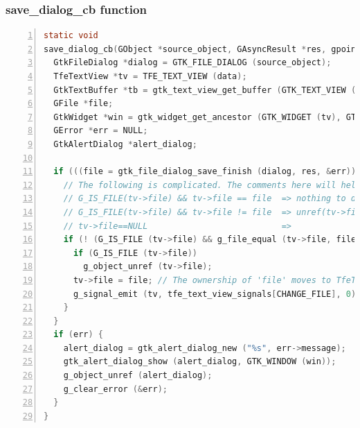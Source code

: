 \subsubsection{save\_dialog\_cb function}\label{save_dialog_cb-function}

\begin{lstlisting}[language=C, numbers=left]
static void
save_dialog_cb(GObject *source_object, GAsyncResult *res, gpointer data) {
  GtkFileDialog *dialog = GTK_FILE_DIALOG (source_object);
  TfeTextView *tv = TFE_TEXT_VIEW (data);
  GtkTextBuffer *tb = gtk_text_view_get_buffer (GTK_TEXT_VIEW (tv));
  GFile *file;
  GtkWidget *win = gtk_widget_get_ancestor (GTK_WIDGET (tv), GTK_TYPE_WINDOW);
  GError *err = NULL;
  GtkAlertDialog *alert_dialog;

  if (((file = gtk_file_dialog_save_finish (dialog, res, &err)) != NULL) && save_file(file, tb, GTK_WINDOW (win))) {
    // The following is complicated. The comments here will help your understanding
    // G_IS_FILE(tv->file) && tv->file == file  => nothing to do
    // G_IS_FILE(tv->file) && tv->file != file  => unref(tv->file), tv->file=file, emit change_file signal
    // tv->file==NULL                           =>                  tv->file=file, emit change_file signal
    if (! (G_IS_FILE (tv->file) && g_file_equal (tv->file, file))) {
      if (G_IS_FILE (tv->file))
        g_object_unref (tv->file);
      tv->file = file; // The ownership of 'file' moves to TfeTextView.
      g_signal_emit (tv, tfe_text_view_signals[CHANGE_FILE], 0);
    }
  }
  if (err) {
    alert_dialog = gtk_alert_dialog_new ("%s", err->message);
    gtk_alert_dialog_show (alert_dialog, GTK_WINDOW (win));
    g_object_unref (alert_dialog);
    g_clear_error (&err);
  }
}
\end{lstlisting}

